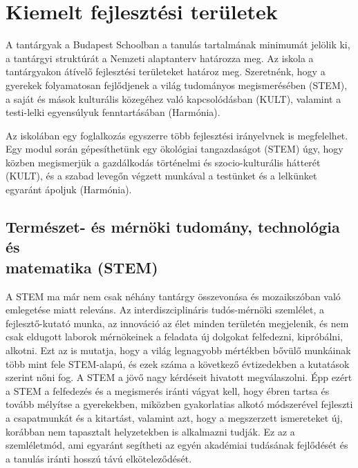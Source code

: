 \hypertarget{kiemelt-fejlesztesi-teruletek}{%
\section{Kiemelt fejlesztési
területek}\label{kiemelt-fejlesztesi-teruletek}}

A tantárgyak a Budapest Schoolban a tanulás tartalmának minimumát
jelölik ki, a tantárgyi struktúrát a Nemzeti alaptanterv határozza meg.
Az iskola a tantárgyakon átívelő fejlesztési területeket határoz meg.
Szeretnénk, hogy a gyerekek folyamatosan fejlődjenek a világ tudományos
megismerésében (STEM), a saját és mások kulturális közegéhez való
kapcsolódásban (KULT), valamint a testi-lelki egyensúlyuk fenntartásában
(Harmónia).

Az iskolában egy foglalkozás egyszerre több fejlesztési irányelvnek is
megfelelhet. Egy modul során gépesíthetünk egy ökológiai
tangazdaságot (STEM) úgy, hogy közben megismerjük a gazdálkodás történelmi
és szocio-kulturális hátterét (KULT), és a szabad levegőn végzett
munkával a testünket és a lelkünket egyaránt ápoljuk (Harmónia).

\hypertarget{termeszet--es-mernoki-tudomany-technologia-es-matematika-stem}{%
\subsection{Természet- és mérnöki tudomány, technológia és\\ matematika
(STEM)}\label{termeszet--es-mernoki-tudomany-technologia-es-matematika-stem}}

A STEM ma már nem csak néhány tantárgy összevonása és mozaikszóban való
emlegetése miatt releváns. Az interdiszciplináris tudós-mérnöki
szemlélet, a fejlesztő-kutató munka, az innováció az élet minden
területén megjelenik, és nem csak eldugott laborok mérnökeinek a
feladata új dolgokat felfedezni, kipróbálni, alkotni. Ezt az is mutatja,
hogy a világ legnagyobb mértékben bővülő munkáinak több mint fele
STEM-alapú, és ezek száma a következő évtizedekben a kutatások szerint
nőni fog. A STEM a jövő nagy kérdéseit hivatott megválaszolni. Épp ezért
a STEM a felfedezés és a megismerés iránti vágyat kell, hogy ébren
tartsa és tovább mélyítse a gyerekekben, miközben gyakorlatias alkotó
módszerével fejleszti a csapatmunkát és a kitartást, valamint azt, hogy
a megszerzett ismereteket új, korábban nem tapasztalt helyzetekben is
alkalmazni tudják. Ez az a szemléletmód, ami egyaránt segítheti az egyén
akadémiai tudásának fejlődését és a tanulás iránti hosszú távú
elköteleződését.

